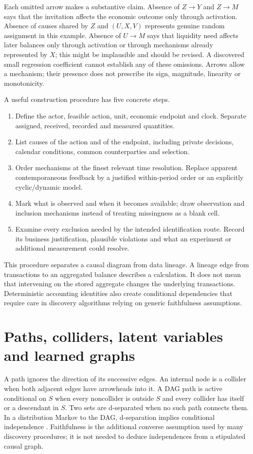 Each omitted arrow makes a substantive claim. Absence of $Z\to Y$ and
$Z\to M$ says that the invitation affects the economic outcome only through
activation. Absence of causes shared by $Z$ and $(U,X,V)$ represents genuine
random assignment in this example. Absence of $U\to M$ says that liquidity
need affects later balances only through activation or through mechanisms
already represented by $X$; this might be implausible and should be revised.
A discovered small regression coefficient cannot establish any of these
omissions. Arrows allow a mechanism; their presence does not prescribe its
sign, magnitude, linearity or monotonicity.

A useful construction procedure has five concrete steps.
\begin{enumerate}
 \item Define the actor, feasible action, unit, economic endpoint and clock.
       Separate assigned, received, recorded and measured quantities.
 \item List causes of the action and of the endpoint, including private
       decisions, calendar conditions, common counterparties and selection.
 \item Order mechanisms at the finest relevant time resolution. Replace
       apparent contemporaneous feedback by a justified within-period order
       or an explicitly cyclic/dynamic model.
 \item Mark what is observed and when it becomes available; draw observation
       and inclusion mechanisms instead of treating missingness as a blank cell.
 \item Examine every exclusion needed by the intended identification route.
       Record its business justification, plausible violations and what an
       experiment or additional measurement could resolve.
\end{enumerate}
This procedure separates a causal diagram from data lineage. A lineage edge
from transactions to an aggregated balance describes a calculation. It does
not mean that intervening on the stored aggregate changes the underlying
transactions. Deterministic accounting identities also create conditional
dependencies that require care in discovery algorithms relying on generic
faithfulness assumptions.

\section{Paths, colliders, latent variables and learned graphs}
\label{r3:separation}
A path ignores the direction of its successive edges. An internal node is
a collider when both adjacent edges have arrowheads into it. A DAG path is
active conditional on $S$ when every noncollider is outside $S$ and every
collider has itself or a descendant in $S$. Two sets are d-separated when
no such path connects them. In a distribution Markov to the DAG,
d-separation implies conditional independence
\citep[Definition 1]{pearl2009}. Faithfulness is the additional converse
assumption used by many discovery procedures; it is not needed to deduce
independences from a stipulated causal graph.

